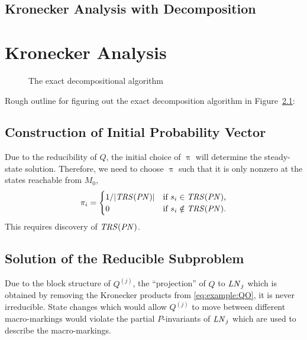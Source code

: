 \documentclass[a4paper,10pt,twoside,openright]{memoir}
\newcommand*{\PN}{\textnormal{\emph{PN}}}
\newcommand*{\LN}{\textnormal{\emph{LN}}}
\renewcommand*{\vec}[1]{\boldsymbol{\mathrm{#1}}}
\newcommand*{\TRS}{\textnormal{\emph{TRS}}}
\begin{document}
\section{Kronecker Analysis with Decomposition}

\chapter{Kronecker Analysis}

\begin{figure}
  {\centering
    
    \par}
  \caption{The exact decompositional algorithm}
  \label{fig:kronecker:flowchart}
\end{figure}

Rough outline for figuring out the exact decomposition algorithm
\citep{bao2008decompositional} in Figure~\ref{fig:kronecker:flowchart}:

\section{Construction of Initial Probability Vector}

Due to the reducibility of $Q$, the initial choice of $\vec{\uppi}$ will
determine the steady-state solution. Therefore, we need to choose
$\vec{\uppi}$ such that it is only nonzero at the states reachable from
$M_0$,
\begin{equation}
  \pi_i = \begin{cases}
    1 / \lvert \TRS(\PN) \rvert & \text{if $s_i \in \TRS(\PN)$,} \\
    0 & \text{if $s_i \notin \TRS(\PN)$.} \\
  \end{cases}
\end{equation}
This requires discovery of $\TRS(\PN)$.

\section{Solution of the Reducible Subproblem}

Due to the block structure of $Q^{(j)}$, the ``projection'' of $Q$ to
$\LN_j$ which is obtained by removing the Kronecker products from
\eqref{eq:example:QO}, it is never irreducible. State changes which
would allow $Q^{(j)}$ to move between different macro-markings would violate
the partial $P$-invariants of $\LN_j$ which are used to describe the
macro-markings.
\end{document}
